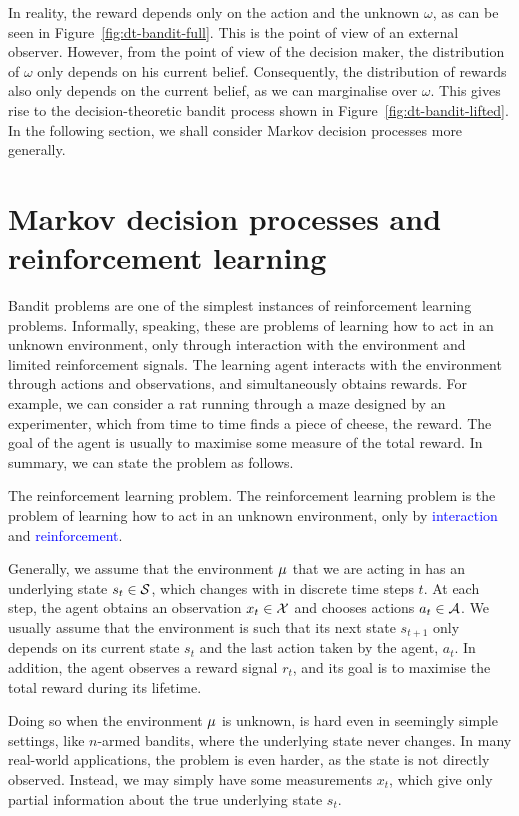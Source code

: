 In reality, the reward depends only on the action and the unknown $\omega$, as can be seen in Figure~\ref{fig:dt-bandit-full}. This is the point of view of an external observer. However, from the point of view of the decision maker, the distribution of $\omega$ only depends on his current belief. Consequently, the distribution of rewards also only depends on the current belief, as we can marginalise over $\omega$. This gives rise to the decision-theoretic bandit process shown in Figure~\ref{fig:dt-bandit-lifted}.
In the following section, we shall consider Markov decision processes more generally.

\section{Markov decision processes and reinforcement learning}
\label{sec:MDP}
Bandit problems are one of the simplest instances of reinforcement learning problems. Informally, speaking, these are problems of learning how to act in an unknown environment, only through interaction with the environment and limited reinforcement signals.
The learning agent interacts with the environment through actions and observations, and simultaneously obtains rewards. For example, we can consider a rat running through a maze designed by an experimenter, which from time to time finds a piece of cheese, the reward. 
The goal of the agent is usually to maximise some measure of the total reward. In summary, we can state the problem as follows.
\begin{block}{The reinforcement learning problem.}
  The reinforcement learning problem is the problem of \alert{learning} how to act in an \alert{unknown} environment, only by \textcolor{blue}{interaction} and \textcolor{blue}{reinforcement}.
\end{block}
Generally, we assume that the environment $\mu$ that we are acting in
has an underlying state $s_t \in {\mathcal{S}}$, which changes with in discrete
time steps $t$. At each step, the agent obtains an observation $x_t \in
{\mathcal{X}}$ and chooses actions $a_t \in {\mathcal{A}}$. We usually assume that the
environment is such that its next state $s_{t+1}$ only depends on its
current state $s_t$ and the last action taken by the agent, $a_t$. In
addition, the agent observes a reward signal $r_t$, and its goal is to
maximise the total reward during its lifetime.

Doing so when the environment $\mu$ is unknown, is hard even in
seemingly simple settings, like $n$-armed bandits, where the
underlying state never changes. In many real-world applications, the
problem is even harder, as the state is not directly
observed. Instead, we may simply have some measurements $x_t$, which
give only partial information about the true underlying state $s_t$.

